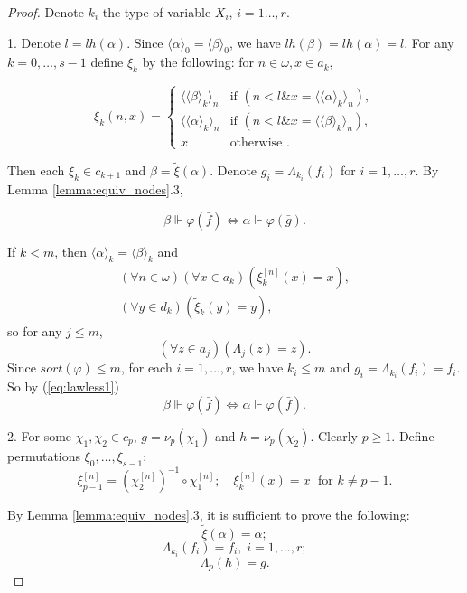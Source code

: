 \documentclass{asl}
\theoremstyle{definition}
\begin{document}
\begin{proof} 
Denote $k_i$ the type of variable $X_i$, $i=1\ldots,r$.

1. Denote $ l=lh(\alpha)$. Since $ \langle \alpha \rangle_0  = \langle \beta\rangle _0 $, we have $lh(\beta)=lh(\alpha)=l$. For any $ k=0,\ldots,s-1 $ define $ \xi_{k} $ by the following: for $ n\in\omega,x\in a_k,$

\begin{displaymath}
\xi_k(n,x)=
\begin{cases}
\langle \langle \beta\rangle _k\rangle _n & \text{if } \left( n<l \& x= \langle \langle \alpha\rangle _k\rangle _n\right) ,\\
\langle \langle \alpha\rangle _k\rangle _n & \text{if } \left( n<l \& x= \langle \langle \beta\rangle _k\rangle _n\right) ,\\
x & \text{otherwise }.
\end{cases} 
\end{displaymath}

Then each $ \xi_k \in c_{k+1} $ and $ \beta=\tilde{\xi}(\alpha) $.
Denote $ g_i=\Lambda_{k_i}\left(f_i \right)$ for $ i=1,\ldots,r $. By Lemma \ref{lemma:equiv_nodes}.3, 

\begin{equation}
\beta\Vdash \varphi(\bar{f}) \Leftrightarrow\alpha\Vdash \varphi(\bar{g}). \label{eq:lawless1}
\end{equation} 

If $ k<m$, then $\langle \alpha \rangle_k  = \langle \beta\rangle _k$ and 
\begin{eqnarray}
(\forall n\in \omega)(\forall x \in a_k)\left(\xi_k^{[n]}(x)=x \right),
\nonumber\\ 
(\forall y \in d_k)\left(\tilde{\xi}_k(y)=y \right),
\nonumber
\end{eqnarray}
so for any $ j\leqslant m $,
\[ (\forall z\in a_j)\left(\Lambda_j(z)=z \right) . \]
Since $ sort(\varphi)\leqslant m $, for each $ i=1,\ldots,r$, we have $k_i\leqslant m $ and 
$ g_i=\Lambda_{k_i}(f_i)=f_i$. So by (\ref{eq:lawless1}) 
\[ \beta\Vdash \varphi(\bar{f})\Leftrightarrow\alpha\Vdash \varphi(\bar{f}).\]

2. For some $ \chi_1,\chi_2 \in c_{p} $, $ g=\nu_p(\chi_1) $ and $ h=\nu_p(\chi_2) $. Clearly $ p\geqslant 1$. Define permutations $ \xi_0,\ldots,\xi_{s-1} $:
\[\xi_{p-1}^{[n]}=\left( \chi_2^{[n]}\right)^{-1}\circ\chi_1^{[n]}; \quad   \xi_k^{[n]}(x)=x\;  \text{ for }k\neq p-1. \]

By Lemma \ref{lemma:equiv_nodes}.3, it is sufficient to prove the following:
\begin{equation}
\tilde{\xi}(\alpha)=\alpha; \label{eq:lawless2}
\end{equation}
\begin{equation}
\Lambda_{k_i}\left(f_i \right)=f_i,\;i=1,\ldots,r; \label{eq:lawless3}
\end{equation}
\begin{equation}
\Lambda_p(h)=g. \label{eq:lawless4}
\end{equation}


\end{proof}
\end{document}
